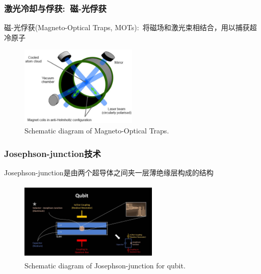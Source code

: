 \begin{frame}
	\frametitle{激光冷却与俘获:~磁-光俘获}
	磁-光俘获\textrm{(Magneto-Optical Traps, MOTs)}:~将磁场和激光束相结合，用以捕获超冷原子
    \begin{figure}
        \centering
                \includegraphics[height=1.5in, width=2.2in, viewport=0 0 500 341,clip]{Figures/Atom-MOT-and-laser-cooling_MOTs.png}
		\caption{\tiny{\textrm{Schematic diagram of Magneto-Optical Traps.}}}
		\label{Fig:Atom-MOT-and-laser-cooling_MOTs}
    \end{figure}
	    \vskip -10pt
    {\fontsize{7.5pt}{5.2pt}\selectfont{由多束对向激光束构成稳定的区域，并利用磁场将原子约束在该区域:\\
    原子在该区域内运动时，将感受到指向激光束束心的回复力。由此将形成冷原子凝聚云，并可以长期保持}}
\end{frame}

\begin{frame}
	\frametitle{\textrm{Josephson-junction}技术}
		    \textrm{Josephson-junction}是由两个超导体之间夹一层薄绝缘层构成的结构\\
		    {\fontsize{7.5pt}{5.2pt}}
    \begin{figure}
        \centering
                \includegraphics[height=1.5in, width=2.6in, viewport=0 0 1400 744,clip]{Figures/Schematic-Josephson_junction-for-qubit.jpg}
		\caption{\tiny{\textrm{Schematic diagram of Josephson-junction for qubit.}}}
		\label{Fig:Josephson-junction}
    \end{figure}
	    \vskip -10pt
    {\fontsize{7.5pt}{5.2pt}}
\end{frame}

